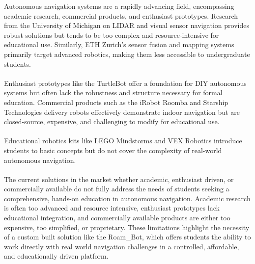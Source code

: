 Autonomous navigation systems are a rapidly advancing field, encompassing academic research, commercial products, and enthusiast prototypes. Research from the University of Michigan on LIDAR and visual sensor navigation \cite{Howard2023} provides robust solutions but tends to be too complex and resource-intensive for educational use. Similarly, ETH Zurich's sensor fusion and mapping systems \cite{Allen2022} primarily target advanced robotics, making them less accessible to undergraduate students.
\\\\
Enthusiast prototypes like the TurtleBot \cite{TurtleBot2021} offer a foundation for DIY autonomous systems but often lack the robustness and structure necessary for formal education. Commercial products such as the iRobot Roomba and Starship Technologies delivery robots \cite{Starship2022} effectively demonstrate indoor navigation but are closed-source, expensive, and challenging to modify for educational use.
\\\\
Educational robotics kits like LEGO Mindstorms and VEX Robotics \cite{LEGO2020} introduce students to basic concepts but do not cover the complexity of real-world autonomous navigation.
\\\\
The current solutions in the market whether academic, enthusiast driven, or commercially available do not fully address the needs of students seeking a comprehensive, hands-on education in autonomous navigation. Academic research is often too advanced and resource intensive, enthusiast prototypes lack educational integration, and commercially available products are either too expensive, too simplified, or proprietary. These limitations highlight the necessity of a custom built solution like the Roam\_Bot, which offers students the ability to work directly with real world navigation challenges in a controlled, affordable, and educationally driven platform.



